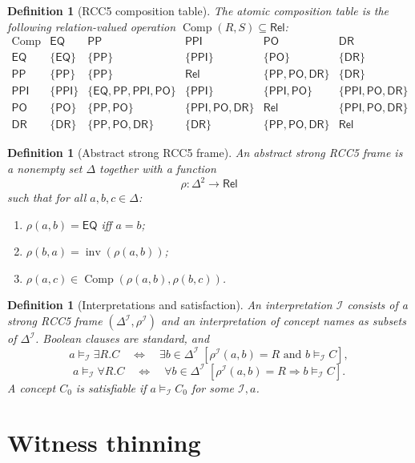 \documentclass[11pt]{article}
\newtheorem{definition}[theorem]{Definition}
\newcommand{\Rel}{\mathsf{Rel}}
\newcommand{\EQ}{\mathsf{EQ}}
\newcommand{\PP}{\mathsf{PP}}
\newcommand{\PPI}{\mathsf{PPI}}
\newcommand{\PO}{\mathsf{PO}}
\newcommand{\DR}{\mathsf{DR}}
\newcommand{\Comp}{\operatorname{Comp}}
\newcommand{\Inv}{\operatorname{inv}}
\begin{document}
\begin{definition}[RCC5 composition table]
The atomic composition table is the following relation-valued operation $\Comp(R,S)\subseteq\Rel$:
\[
\begin{array}{c|ccccc}
\Comp & \EQ & \PP & \PPI & \PO & \DR\\
\hline
\EQ  & \{\EQ\} & \{\PP\} & \{\PPI\} & \{\PO\} & \{\DR\}\\
\PP  & \{\PP\} & \{\PP\} & \Rel & \{\PP,\PO,\DR\} & \{\DR\}\\
\PPI & \{\PPI\} & \{\EQ,\PP,\PPI,\PO\} & \{\PPI\} & \{\PPI,\PO\} & \{\PPI,\PO,\DR\}\\
\PO  & \{\PO\} & \{\PP,\PO\} & \{\PPI,\PO,\DR\} & \Rel & \{\PPI,\PO,\DR\}\\
\DR  & \{\DR\} & \{\PP,\PO,\DR\} & \{\DR\} & \{\PP,\PO,\DR\} & \Rel
\end{array}
\]
\end{definition}

\begin{definition}[Abstract strong RCC5 frame]
An abstract strong RCC5 frame is a nonempty set $\Delta$ together with a function
\[
  \rho:\Delta^2\to\Rel
\]
such that for all $a,b,c\in\Delta$:
\begin{enumerate}[label=(R\arabic*)]
\item $\rho(a,b)=\EQ$ iff $a=b$;
\item $\rho(b,a)=\Inv(\rho(a,b))$;
\item $\rho(a,c)\in\Comp(\rho(a,b),\rho(b,c))$.
\end{enumerate}
\end{definition}

\begin{definition}[Interpretations and satisfaction]
An interpretation $\mathcal I$ consists of a strong RCC5 frame $(\Delta^\mathcal I,\rho^\mathcal I)$ and an interpretation of concept names as subsets of $\Delta^\mathcal I$.  Boolean clauses are standard, and
\[
 a\models_{\mathcal I}\exists R.C
 \quad\Longleftrightarrow\quad
 \exists b\in\Delta^\mathcal I\;[\rho^\mathcal I(a,b)=R\text{ and }b\models_{\mathcal I} C],
\]
\[
 a\models_{\mathcal I}\forall R.C
 \quad\Longleftrightarrow\quad
 \forall b\in\Delta^\mathcal I\;[\rho^\mathcal I(a,b)=R\Rightarrow b\models_{\mathcal I} C].
\]
A concept $C_0$ is satisfiable if $a\models_{\mathcal I}C_0$ for some $\mathcal I,a$.
\end{definition}

\section{Witness thinning}
\end{document}
